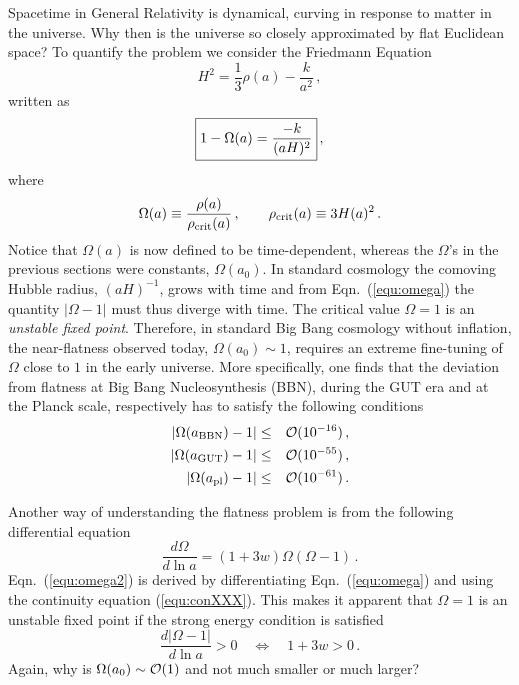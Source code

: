 \documentclass[12pt,letterpaper,rotate]{article}
\begin{document}
{%

Spacetime in General Relativity is dynamical, curving in response to matter in the universe. Why then is the universe so closely approximated by flat Euclidean space?
To quantify the problem we consider the
Friedmann Equation 
\begin{equation}
H^2 = \frac{1}{3} \rho(a) - \frac{k}{a^2}\, ,
\end{equation}
written as 
\begin{equation}
\label{equ:omega}
\fbox{$\displaystyle
1-\Omega(a) = \frac{-k}{(aH)^2}$}\, ,
\end{equation}
where
\begin{equation}
\Omega(a) \equiv \frac{\rho(a)}{\rho_{\rm crit}(a)}\, , \qquad \rho_{\rm crit}(a) \equiv 3 H(a)^2\, .
\end{equation}
Notice that $\Omega(a)$ is now defined to be time-dependent, whereas the $\Omega$'s in the previous sections were constants, $\Omega(a_0)$.
In standard cosmology the comoving Hubble radius, $(aH)^{-1}$,  grows with time and from Eqn.~(\ref{equ:omega}) 
 the quantity $|\Omega-1|$ must thus diverge with time. The critical value $\Omega=1$ is an {\it unstable fixed point}. Therefore, in standard Big Bang cosmology without inflation, the near-flatness observed today, $\Omega(a_0) \sim 1$,
requires an extreme fine-tuning of $\Omega$ close to $1$ in the early 
 universe.
More specifically, one finds that the deviation from flatness at Big Bang Nucleosynthesis (BBN), during the GUT era and at the Planck scale, respectively has to satisfy the following conditions
\begin{eqnarray}
|\Omega(a_{\rm BBN})-1| &\le& {\cal O}(10^{-16})\, ,\\
|\Omega(a_{\rm GUT})-1| &\le& {\cal O}(10^{-55})\, ,\\
|\Omega(a_{\rm pl})-1| &\le& {\cal O}(10^{-61})\, .
\end{eqnarray}

Another way of understanding the flatness problem is from the following differential equation
\begin{equation}
\label{equ:omega2}
\frac{d \Omega}{d \ln a} = (1+3w) \Omega (\Omega-1)\, .
\end{equation}
Eqn.~(\ref{equ:omega2}) is derived by differentiating Eqn.~(\ref{equ:omega}) and using the continuity equation (\ref{equ:conXXX}). This makes it apparent that $\Omega=1$ is an unstable fixed point if the strong energy condition is satisfied 
\begin{equation}
\frac{d |\Omega-1|}{d \ln a} > 0 \quad \Leftrightarrow \quad 1+3w > 0\, .
\end{equation}
Again, why is $\Omega(a_0) \sim {\cal O}(1)$ and not much smaller or much larger?


}
\end{document}
